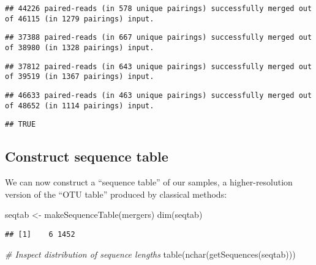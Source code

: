 \documentclass[
]{article}
\newenvironment{Shaded}{\begin{snugshade}}{\end{snugshade}}
\newcommand{\CommentTok}[1]{\textcolor[rgb]{0.56,0.35,0.01}{\textit{#1}}}
\newcommand{\FunctionTok}[1]{\textcolor[rgb]{0.00,0.00,0.00}{#1}}
\newcommand{\NormalTok}[1]{#1}
\newcommand{\OtherTok}[1]{\textcolor[rgb]{0.56,0.35,0.01}{#1}}
\begin{document}
\begin{verbatim}
## 44226 paired-reads (in 578 unique pairings) successfully merged out of 46115 (in 1279 pairings) input.
\end{verbatim}

\begin{verbatim}
## 37388 paired-reads (in 667 unique pairings) successfully merged out of 38980 (in 1328 pairings) input.
\end{verbatim}

\begin{verbatim}
## 37812 paired-reads (in 643 unique pairings) successfully merged out of 39519 (in 1367 pairings) input.
\end{verbatim}

\begin{verbatim}
## 46633 paired-reads (in 463 unique pairings) successfully merged out of 48652 (in 1114 pairings) input.
\end{verbatim}

\begin{verbatim}
## TRUE
\end{verbatim}

\hypertarget{construct-sequence-table}{%
\subsection{Construct sequence table}\label{construct-sequence-table}}

We can now construct a ``sequence table'' of our samples, a
higher-resolution version of the ``OTU table'' produced by classical
methods:

\begin{Shaded}
\begin{Highlighting}[]
\NormalTok{seqtab }\OtherTok{\textless{}{-}} \FunctionTok{makeSequenceTable}\NormalTok{(mergers)}
\FunctionTok{dim}\NormalTok{(seqtab)}
\end{Highlighting}
\end{Shaded}

\begin{verbatim}
## [1]    6 1452
\end{verbatim}

\begin{Shaded}
\begin{Highlighting}[]
\CommentTok{\# Inspect distribution of sequence lengths}
\FunctionTok{table}\NormalTok{(}\FunctionTok{nchar}\NormalTok{(}\FunctionTok{getSequences}\NormalTok{(seqtab)))}
\end{Highlighting}
\end{Shaded}
\end{document}
